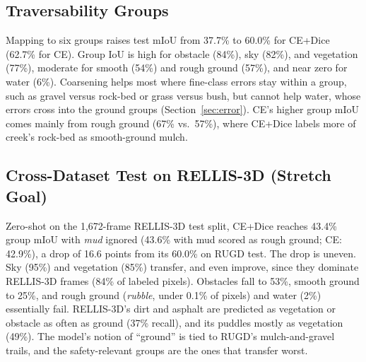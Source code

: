 \subsection{Traversability Groups}
\label{sec:res_groups}

Mapping to six groups raises test mIoU from 37.7\% to 60.0\% for CE+Dice
(62.7\% for CE). Group IoU is high for obstacle (84\%), sky (82\%), and
vegetation (77\%), moderate for smooth (54\%) and rough ground (57\%), and
near zero for water (6\%). Coarsening helps most where fine-class errors stay
within a group, such as gravel versus rock-bed or grass versus bush, but
cannot help water, whose errors cross into the ground groups
(Section~\ref{sec:error}). CE's higher group mIoU comes mainly from rough
ground (67\% vs.\ 57\%), where CE+Dice labels more of creek's rock-bed as
smooth-ground mulch.

\subsection{Cross-Dataset Test on RELLIS-3D (Stretch Goal)}
\label{sec:res_rellis}

Zero-shot on the 1,672-frame RELLIS-3D test split, CE+Dice reaches 43.4\%
group mIoU with \emph{mud} ignored (43.6\% with mud scored as rough ground;
CE: 42.9\%), a drop of 16.6 points from its 60.0\% on RUGD test. The drop is
uneven. Sky (95\%) and vegetation (85\%) transfer, and even improve, since
they dominate RELLIS-3D frames (84\% of labeled pixels). Obstacles fall to
53\%, smooth ground to 25\%, and rough ground (\emph{rubble}, under 0.1\% of
pixels) and water (2\%) essentially fail. RELLIS-3D's dirt and asphalt are
predicted as vegetation or obstacle as often as ground (37\% recall), and its
puddles mostly as vegetation (49\%). The model's notion of ``ground'' is tied
to RUGD's mulch-and-gravel trails, and the safety-relevant groups are the
ones that transfer worst.

